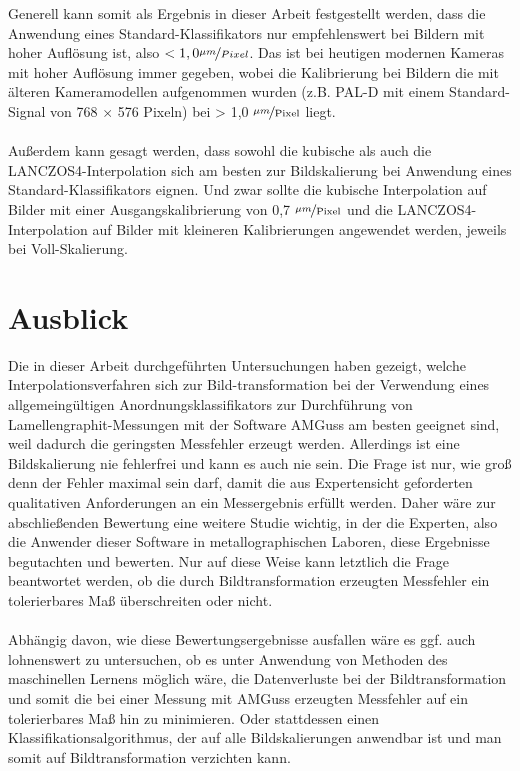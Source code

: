 \documentclass[
fontsize=10pt, 
listof = totoc,
parskip = half	
]{report}
\begin{document}
\noindent Generell kann somit als Ergebnis in dieser Arbeit festgestellt werden, dass die Anwendung eines Standard-Klassifikators nur empfehlenswert bei Bildern mit hoher Auflösung ist, also $< 1,0 \nicefrac{\mu m}{Pixel}$. Das ist bei heutigen modernen Kameras mit hoher Auflösung immer gegeben, wobei die Kalibrierung bei Bildern die mit älteren Kameramodellen  aufgenommen wurden (z.B. PAL-D mit einem Standard-Signal von 768 $\times$ 576 Pixeln) bei > 1,0 $\nicefrac{\mu m}{\text{Pixel}}$ liegt. 
\\\\
\noindent Außerdem kann gesagt werden, dass sowohl die kubische als auch die LANCZOS4-Interpolation sich am besten zur Bildskalierung bei Anwendung eines Standard-Klassifikators eignen. Und zwar sollte die kubische Interpolation auf Bilder mit einer Ausgangskalibrierung von 0,7 $\nicefrac{\mu m}{\text{Pixel}}$ und die LANCZOS4-Interpolation auf Bilder mit kleineren Kalibrierungen angewendet werden, jeweils bei Voll-Skalierung.

\section{Ausblick}
\label{sec:Ausblick}

Die in dieser Arbeit durchgeführten Untersuchungen haben gezeigt, welche Interpolationsverfahren sich zur Bild-transformation bei der Verwendung eines allgemeingültigen Anordnungsklassifikators zur Durchführung von Lamellengraphit-Messungen mit der Software AMGuss am besten geeignet sind, weil dadurch die geringsten Messfehler erzeugt werden. Allerdings ist eine Bildskalierung nie fehlerfrei und kann es auch nie sein. Die Frage ist nur, wie groß denn der Fehler maximal sein darf, damit die aus Expertensicht geforderten qualitativen Anforderungen an ein Messergebnis erfüllt werden. Daher wäre zur abschließenden Bewertung eine weitere Studie wichtig, in der die Experten, also die Anwender dieser Software in metallographischen Laboren, diese Ergebnisse begutachten und bewerten. Nur auf diese Weise kann letztlich die Frage beantwortet werden, ob die durch Bildtransformation erzeugten Messfehler ein tolerierbares Maß überschreiten oder nicht. 
\\\\
\noindent Abhängig davon, wie diese Bewertungsergebnisse ausfallen wäre es ggf. auch lohnenswert zu untersuchen, ob es unter Anwendung von Methoden des maschinellen Lernens möglich wäre, die Datenverluste bei der Bildtransformation und somit die bei einer Messung mit AMGuss erzeugten Messfehler auf ein tolerierbares Maß hin zu minimieren. Oder stattdessen einen Klassifikationsalgorithmus, der auf alle Bildskalierungen anwendbar ist und man somit auf Bildtransformation verzichten kann.
\end{document}
